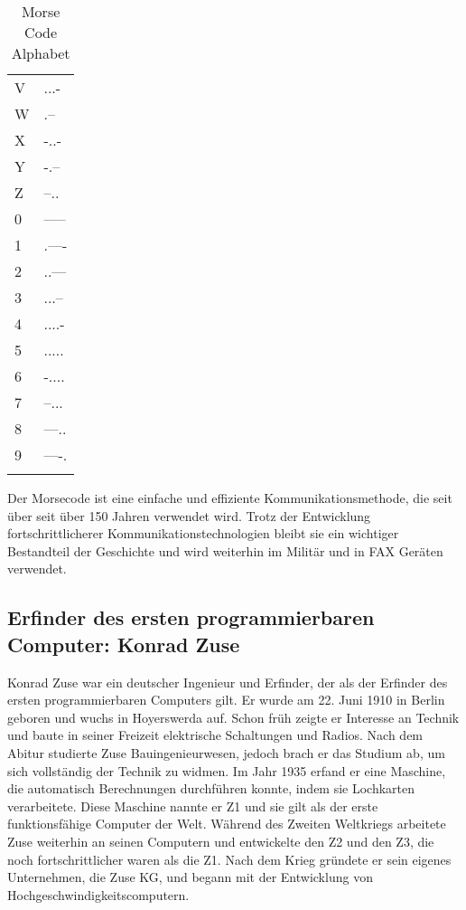\documentclass[12pt]{article}
\begin{document}
\begin{table}[!htb]
\begin{minipage}{.5\linewidth}
\begin{tabular}{ll}
            V & ...- \\
            W & .-- \\
            X & -..- \\
            Y & -.-- \\
            Z & --.. \\
            0 & ----- \\
            1 & .---- \\
            2 & ..--- \\
            3 & ...-- \\
            4 & ....- \\
            5 & ..... \\
            6 & -.... \\
            7 & --... \\
            8 & ---.. \\
            9 & ----. \\
              &  \\
        \end{tabular}
    \end{minipage} 
    \caption{Morse Code Alphabet}
\end{table}


Der Morsecode ist eine einfache und effiziente Kommunikationsmethode, die seit über
seit über 150 Jahren verwendet wird. Trotz der Entwicklung fortschrittlicherer Kommunikationstechnologien
bleibt sie ein wichtiger Bestandteil der Geschichte und wird weiterhin im Militär und in FAX Geräten verwendet.


\subsection{Erfinder des ersten programmierbaren Computer: Konrad Zuse}
Konrad Zuse war ein deutscher Ingenieur und Erfinder, der als der Erfinder des ersten programmierbaren Computers gilt. Er wurde am 22. Juni 1910 in Berlin geboren und wuchs in Hoyerswerda auf. 
Schon früh zeigte er Interesse an Technik und baute in seiner Freizeit elektrische Schaltungen und Radios.
Nach dem Abitur studierte Zuse Bauingenieurwesen, jedoch brach er das Studium ab, um sich vollständig der Technik zu widmen. 
Im Jahr 1935 erfand er eine Maschine, die automatisch Berechnungen durchführen konnte, indem sie Lochkarten verarbeitete. Diese Maschine nannte er Z1 und sie gilt als der erste funktionsfähige Computer der Welt.
Während des Zweiten Weltkriegs arbeitete Zuse weiterhin an seinen Computern und entwickelte den Z2 und den Z3, die noch fortschrittlicher waren als die Z1. 
Nach dem Krieg gründete er sein eigenes Unternehmen, die Zuse KG, und begann mit der Entwicklung von Hochgeschwindigkeitscomputern.
\end{document}

